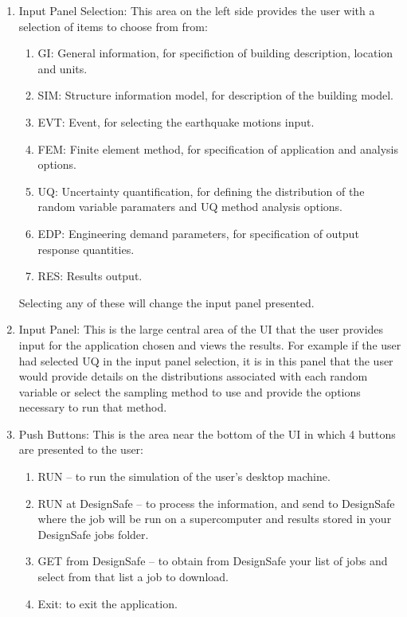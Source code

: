 \begin{enumerate}

\item Input Panel Selection: This  area on the left side provides the user with a selection of items to choose from from: 

\begin{enumerate}
  \item GI: General information, for specifiction of building description, location and units.
  \item SIM: Structure information model, for description of the building model.
  \item EVT: Event, for selecting the earthquake motions input.
  \item FEM: Finite element method, for specification of application and analysis options.
  \item UQ: Uncertainty quantification, for defining the distribution of the random
  variable paramaters and UQ method analysis options.
  \item EDP: Engineering demand parameters, for specification of output response quantities.
  \item RES: Results output.
\end{enumerate}

Selecting any of these will change the input panel presented.

\item Input Panel: This is the large central area of the UI that the user provides input
for the application chosen and views the results. For example if the user had selected UQ in the input panel selection, it is in this panel that the user would provide details on the distributions associated with each random variable or select the sampling method to use and provide the options necessary to run that method.

\item Push Buttons: This is the area near the bottom of the UI in which 4 buttons are presented to the user:

\begin{enumerate}
\item	RUN – to run the simulation of the user’s desktop machine.
\item	RUN at DesignSafe – to process the information, and send to DesignSafe where the job will be run on a supercomputer and results stored in your DesignSafe jobs folder.
\item	GET from DesignSafe – to obtain from DesignSafe your list of jobs and select from that list a job to download.
\item	Exit: to exit the application.
\end{enumerate}


\end{enumerate}
